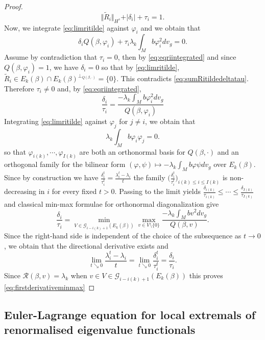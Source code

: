 \documentclass[10pt]{amsart}
\numberwithin{equation}{section}
\newcommand{\vp}{\varphi}
\theoremstyle{plain}
\theoremstyle{remark}
\begin{document}
\begin{proof}
\begin{equation} \label{eq:sumRitildedeltatau} \Vert \tilde{R}_i \Vert_{H^s} + \vert \delta_i \vert + \tau_i = 1. \end{equation}
Now, we integrate \eqref{eq:limritilde} against $\vp_i$ and we obtain that
\begin{equation} \label{eq:eqriintegrated}
\delta_i Q(\beta,\vp_i) + \tau_i \lambda_k \int_{M} b \vp_i^2 dv_g = 0.
\end{equation}
Assume by contradiction that $\tau_i = 0$, then by \eqref{eq:eqriintegrated} and since $Q(\beta,\vp_i) = 1$, we have  $\delta_i=0$ so that  by \eqref{eq:limritilde}, $\tilde{R}_i \in E_k(\beta) \cap E_k(\beta)^{\perp_{Q(\beta,\cdot)}} = \{0\}$. This contradicts \eqref{eq:sumRitildedeltatau}. Therefore $\tau_i \neq 0$ and, by \eqref{eq:eqriintegrated}, 
$$ \frac{\delta_i}{\tau_i} = \frac{-\lambda_k\int_M b\vp_i^2 dv_g }{Q(\beta,\vp_i)} $$
Integrating \eqref{eq:limritilde} against $\vp_j$ for $j\neq i$, we obtain that
$$ \lambda_k \int_M b \vp_i \vp_j = 0 .$$
so that $\vp_{i(k)},\cdots,\vp_{I(k)}$ are both an orthonormal basis for $Q(\beta,\cdot)$ and an orthogonal family for the bilinear form $(\vp,\psi) \mapsto  -\lambda_k \int_M b\vp \psi dv_g $ over $E_k(\beta)$. Since by construction we have $\frac{\delta_i^t}{\tau_i^t}  = \frac{\lambda_i^t - \lambda_i}{t}$ the family $\big(\frac{\delta_{i}^t }{\tau_{i}^t}\big)_{i(k) \le i \le I(k)}$ is non-decreasing in $i$ for every fixed $t >0$. Passing to the limit yields $\frac{\delta_{i(k)}}{\tau_{i(k)}}\leq \cdots \leq \frac{\delta_{I(k)}}{\tau_{I(k)}}$ and classical min-max formulae for orthonormal diagonalization give
$$ \frac{\delta_i}{\tau_i} = \min_{ V \in \mathcal{G}_{i-i(k)+1}(E_k(\beta)) } \max_{v \in V\setminus \{0\}} \frac{-\lambda_k\int_M bv^2 dv_g }{Q(\beta,v)} .$$
Since the right-hand side is independent of the choice of the subsequence as $t\to 0$, we obtain that the directional derivative exists and
$$ \lim_{t\searrow 0} \frac{\lambda_i^t-\lambda_i}{t} = \lim_{t\searrow 0} \frac{\delta_i^t}{\tau_i^t} = \frac{\delta_i}{\tau_i} .$$
Since $\mathcal{R}(\beta,v) = \lambda_k$ when $v \in V \in \mathcal{G}_{i-i(k)+1}(E_k(\beta))$ this proves \eqref{eq:firstderivativeminmax}
\end{proof}

\subsection{Euler-Lagrange equation for local extremals of renormalised eigenvalue functionals}
\end{document}
